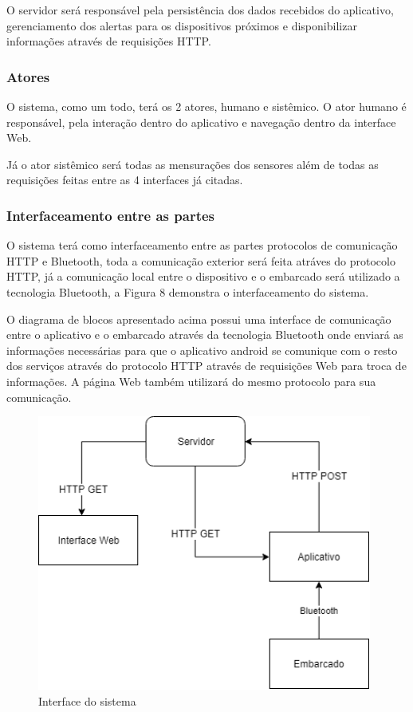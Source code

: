O servidor será responsável pela persistência dos dados recebidos do aplicativo, gerenciamento dos alertas para os dispositivos próximos e disponibilizar informações através de requisições HTTP.


\subsubsection{Atores}

O sistema, como um todo, terá os 2 atores, humano e sistêmico.
O ator humano é responsável, pela interação dentro do aplicativo e navegação dentro da interface Web.

Já o ator sistêmico será todas as mensurações dos sensores além de todas as requisições feitas entre as 4 interfaces já citadas.





\subsubsection{Interfaceamento entre as partes}

O sistema terá como interfaceamento entre as partes  protocolos de comunicação HTTP e Bluetooth, toda a comunicação exterior será feita atráves do protocolo HTTP, já a comunicação local entre o dispositivo e o embarcado será utilizado a tecnologia Bluetooth, a Figura 8 demonstra o interfaceamento do sistema.


O diagrama de blocos apresentado acima possui uma interface de comunicação entre o aplicativo e  o embarcado através da tecnologia Bluetooth onde  enviará as informações necessárias para que o aplicativo android se comunique com o resto dos serviços através do protocolo HTTP através de requisições Web para troca de informações. A página Web também utilizará do mesmo protocolo para sua comunicação.



\begin{figure}[H]

 \caption{Interface do sistema}
\centering
  \includegraphics[width=110mm]{images/Cap3/diagrama_funcionamento.png}
            
    
\end{figure}


